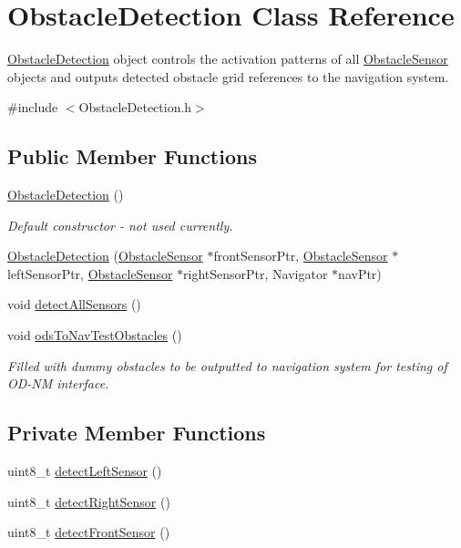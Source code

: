 \hypertarget{class_obstacle_detection}{}\section{Obstacle\+Detection Class Reference}
\label{class_obstacle_detection}


\mbox{\hyperlink{class_obstacle_detection}{Obstacle\+Detection}} object controls the activation patterns of all \mbox{\hyperlink{class_obstacle_sensor}{Obstacle\+Sensor}} objects and outputs detected obstacle grid references to the navigation system.  




{\ttfamily \#include $<$Obstacle\+Detection.\+h$>$}

\subsection*{Public Member Functions}
\begin{DoxyCompactItemize}
\item 
\mbox{\hyperlink{class_obstacle_detection_a1ef460cae951b0ddaa04088645109f47}{Obstacle\+Detection}} ()
\begin{DoxyCompactList}\small\item\em Default constructor -\/ not used currently. \end{DoxyCompactList}\item 
\mbox{\hyperlink{class_obstacle_detection_ab70842be18c993b94612f17b653f3674}{Obstacle\+Detection}} (\mbox{\hyperlink{class_obstacle_sensor}{Obstacle\+Sensor}} $\ast$front\+Sensor\+Ptr, \mbox{\hyperlink{class_obstacle_sensor}{Obstacle\+Sensor}} $\ast$left\+Sensor\+Ptr, \mbox{\hyperlink{class_obstacle_sensor}{Obstacle\+Sensor}} $\ast$right\+Sensor\+Ptr, Navigator $\ast$nav\+Ptr)
\item 
void \mbox{\hyperlink{class_obstacle_detection_afe8d20425157946ba8e562d9696fef86}{detect\+All\+Sensors}} ()
\item 
void \mbox{\hyperlink{class_obstacle_detection_a4977cf4929ce5b8ec1b42353df9bd2b7}{ods\+To\+Nav\+Test\+Obstacles}} ()
\begin{DoxyCompactList}\small\item\em Filled with dummy obstacles to be outputted to navigation system for testing of O\+D-\/\+NM interface. \end{DoxyCompactList}\end{DoxyCompactItemize}
\subsection*{Private Member Functions}
\begin{DoxyCompactItemize}
\item 
uint8\+\_\+t \mbox{\hyperlink{class_obstacle_detection_adbb2c4295e35c5c4c2b63aed42588bd0}{detect\+Left\+Sensor}} ()
\item 
uint8\+\_\+t \mbox{\hyperlink{class_obstacle_detection_a135adf6077c8af44e33e6814ad7ee9f0}{detect\+Right\+Sensor}} ()
\item 
uint8\+\_\+t \mbox{\hyperlink{class_obstacle_detection_aa7974520bcbaa2d10254fb498347b8c3}{detect\+Front\+Sensor}} ()
\end{DoxyCompactItemize}
